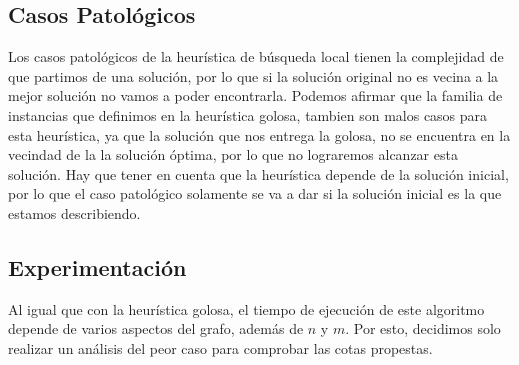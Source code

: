\subsection{Casos Patológicos}

Los casos patológicos de la heurística de búsqueda local tienen la complejidad de que partimos de una solución, por lo que si la solución original no es vecina a la mejor solución no vamos a poder encontrarla. Podemos afirmar que la familia de instancias que definimos en la heurística golosa, tambien son malos casos para esta heurística, ya que la solución que nos entrega la golosa, no se encuentra en la vecindad de la la solución óptima, por lo que no lograremos alcanzar esta solución. Hay que tener en cuenta que la heurística depende de la solución inicial, por lo que el caso patológico solamente se va a dar si la solución inicial es la que estamos describiendo.

\subsection{Experimentación}

Al igual que con la heurística golosa, el tiempo de ejecución de este algoritmo depende de varios aspectos del grafo, además de $n$ y $m$. Por esto, decidimos solo realizar un análisis del peor caso para comprobar las cotas propestas.

